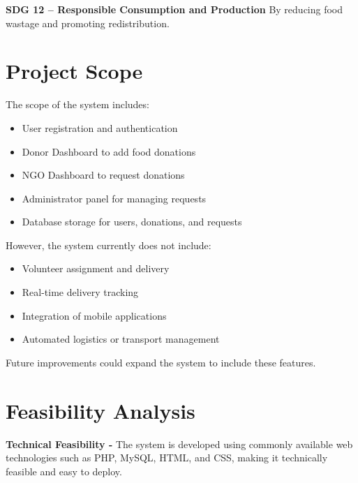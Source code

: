 \textbf{SDG 12 – Responsible Consumption and Production}
 By reducing food wastage and promoting redistribution.







\section{Project Scope}

The scope of the system includes:

\begin{itemize}
    \item User registration and authentication
    \item Donor Dashboard to add food donations
    \item NGO Dashboard to request donations
    \item Administrator panel for managing requests
    \item Database storage for users, donations, and requests
\end{itemize}

 \vspace{10pt}
However, the system currently does not include:

\begin{itemize}
    \item Volunteer assignment and delivery
    \item Real-time delivery tracking
    \item Integration of mobile applications
    \item Automated logistics or transport management
\end{itemize}

 \vspace{5pt}
Future improvements could expand the system to include these features.






 \vspace{40pt}
\section{Feasibility Analysis}


\textbf{Technical Feasibility -} The system is developed using commonly available web technologies such as PHP, MySQL, HTML, and CSS, making it technically feasible and easy to deploy.
\vspace{10pt}

